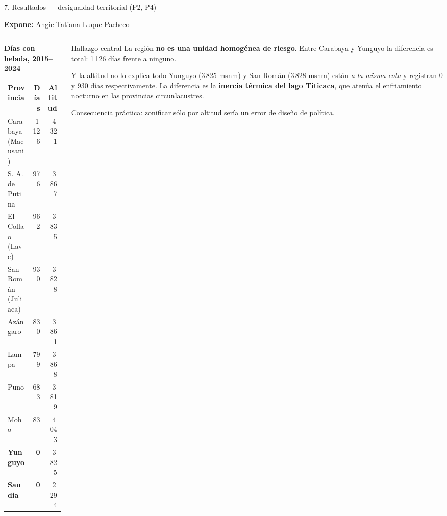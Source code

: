 \documentclass[aspectratio=169,11pt]{beamer}
\newcommand{\ponente}[1]{%
  \begin{flushright}\tiny\textcolor{pnBrandDark}{\textbf{Expone:} #1}\end{flushright}%
  \vspace{-0.9em}%
}
\begin{document}
\begin{frame}{7. Resultados — desigualdad territorial (P2, P4)}
  \ponente{Angie Tatiana Luque Pacheco}
  \scriptsize
  \begin{columns}[T]
    \begin{column}{0.52\textwidth}
      \textbf{Días con helada, 2015–2024}
      \begin{tabular}{@{}lrr@{}}
        \toprule
        Provincia & Días & Altitud \\
        \midrule
        Carabaya (Macusani)   & 1\,126 & 4\,321 \\
        S. A. de Putina       & 976    & 3\,867 \\
        El Collao (Ilave)     & 962    & 3\,835 \\
        San Román (Juliaca)   & 930    & 3\,828 \\
        Azángaro              & 830    & 3\,861 \\
        Lampa                 & 799    & 3\,868 \\
        Puno                  & 683    & 3\,819 \\
        \midrule
        Moho                  & 83     & 4\,043 \\
        \textbf{Yunguyo}      & \textbf{0} & 3\,825 \\
        \textbf{Sandia}       & \textbf{0} & 2\,294 \\
        \bottomrule
      \end{tabular}
    \end{column}
    \begin{column}{0.45\textwidth}
      \begin{block}{Hallazgo central}
        \scriptsize La región \textbf{no es una unidad homogénea de riesgo}. Entre Carabaya y Yunguyo
        la diferencia es total: 1\,126 días frente a ninguno.
      \end{block}
      \vspace{0.3em}
      \begin{block}{Y la altitud no lo explica todo}
        \scriptsize Yunguyo (3\,825 msnm) y San Román (3\,828 msnm) están \emph{a la misma cota} y
        registran 0 y 930 días respectivamente. La diferencia es la \textbf{inercia térmica del lago
        Titicaca}, que atenúa el enfriamiento nocturno en las provincias circunlacustres.
        \vspace{0.2em}

        \alert{Consecuencia práctica:} zonificar sólo por altitud sería un error de diseño de política.
      \end{block}
    \end{column}
  \end{columns}
\end{frame}
\end{document}
